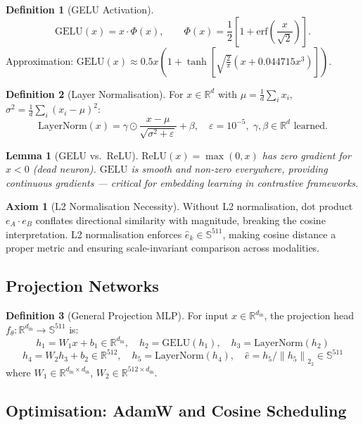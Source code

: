 \documentclass[12pt,a4paper]{article}
\theoremstyle{definition}
\newtheorem{definition}{Definition}[section]
\newtheorem{axiom}{Axiom}[section]
\theoremstyle{plain}
\newtheorem{lemma}[theorem]{Lemma}
\theoremstyle{remark}
\newcommand{\R}{\mathbb{R}}
\newcommand{\Sph}{\mathbb{S}}
\newcommand{\Norm}[1]{\left\|#1\right\|_2}
\newcommand{\LN}{\mathrm{LayerNorm}}
\newcommand{\GELU}{\mathrm{GELU}}
\begin{document}
\begin{definition}[GELU Activation]
\[
  \GELU(x) = x \cdot \Phi(x), \qquad \Phi(x) = \frac{1}{2}\left[1 + \text{erf}\!\left(\frac{x}{\sqrt{2}}\right)\right].
\]
Approximation: $\GELU(x) \approx 0.5x\!\left(1 + \tanh\!\left[\sqrt{\tfrac{2}{\pi}}\left(x + 0.044715x^3\right)\right]\right)$.
\end{definition}

\begin{definition}[Layer Normalisation]
For $x \in \R^d$ with $\mu = \frac{1}{d}\sum_i x_i$, $\sigma^2 = \frac{1}{d}\sum_i (x_i - \mu)^2$:
\[
  \LN(x) = \gamma \odot \frac{x - \mu}{\sqrt{\sigma^2 + \varepsilon}} + \beta, \quad \varepsilon = 10^{-5},\; \gamma, \beta \in \R^d \text{ learned.}
\]
\end{definition}

\begin{lemma}[GELU vs.\ ReLU]
$\text{ReLU}(x) = \max(0,x)$ has zero gradient for $x < 0$ (dead neuron). $\GELU$ is smooth and non-zero everywhere, providing continuous gradients --- critical for embedding learning in contrastive frameworks.
\end{lemma}

\begin{axiom}[L2 Normalisation Necessity]
Without L2 normalisation, dot product $e_A \cdot e_B$ conflates directional similarity with magnitude, breaking the cosine interpretation. L2 normalisation enforces $\hat{e}_k \in \Sph^{511}$, making cosine distance a proper metric and ensuring scale-invariant comparison across modalities.
\end{axiom}

\subsection{Projection Networks}

\begin{definition}[General Projection MLP]
\label{def:projmlp}
For input $x \in \R^{d_{\text{in}}}$, the projection head $f_\theta : \R^{d_{\text{in}}} \to \Sph^{511}$ is:
\[
  h_1 = W_1 x + b_1 \in \R^{d_{\text{in}}}, \quad h_2 = \GELU(h_1), \quad h_3 = \LN(h_2)
\]
\[
  h_4 = W_2 h_3 + b_2 \in \R^{512}, \quad h_5 = \LN(h_4), \quad \hat{e} = h_5 / \Norm{h_5}_2 \in \Sph^{511}
\]
where $W_1 \in \R^{d_{\text{in}} \times d_{\text{in}}}$, $W_2 \in \R^{512 \times d_{\text{in}}}$.
\end{definition}

\subsection{Optimisation: AdamW and Cosine Scheduling}
\end{document}
